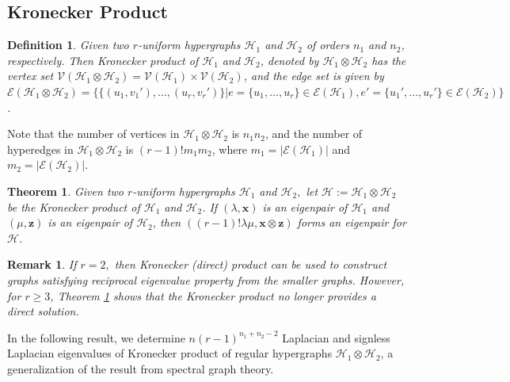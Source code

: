 \documentclass[10pt,a4paper]{article}
\newtheorem{definition}{Definition}[section]
\newtheorem{theorem}{Theorem}[section]
\newtheorem{remark}{Remark}[section]
\begin{document}
	
	
	\subsection{Kronecker Product}
	
	
	
	\begin{definition}\label{Kronecker_product}
		Given two $r$-uniform hypergraphs $\mathcal{H}_1$ and $\mathcal{H}_2$ of orders $n_1$ and $n_2$, respectively. 
		Then Kronecker product of $\mathcal{H}_1$ and $\mathcal{H}_2$, denoted by $\mathcal{H}_1 \otimes \mathcal{H}_2$ has the vertex set $\mathcal{V}(\mathcal{H}_1 \otimes \mathcal{H}_2)= \mathcal{V}(\mathcal{H}_1) \times \mathcal{V}(\mathcal{H}_2)$, and the edge set is given by $\mathcal{E}(\mathcal{H}_1 \otimes \mathcal{H}_2) = \{ \{ (u_1,v_1'), \ldots, (u_r,v_r') \} \vert e=\{u_1,\ldots,u_r \} \in \mathcal{E}(\mathcal{H}_1), e'=\{u_1',\ldots,u_r' \} \in \mathcal{E}(\mathcal{H}_2)\}$.
	\end{definition}
	Note that the number of vertices in $\mathcal{H}_1 \otimes \mathcal{H}_2$ is $n_1n_2$, and the number of hyperedges in $\mathcal{H}_1 \otimes \mathcal{H}_2$ is $(r-1)!m_1m_2$, where $m_1=\vert \mathcal{E}(\mathcal{H}_1)  \vert $ and $m_2=\vert \mathcal{E}(\mathcal{H}_2) \vert.$
	
	
	\begin{theorem}\cite{shao2013general}\label{Kronecker_adjacency}
		Given two $r$-uniform hypergraphs $\mathcal{H}_1$ and $\mathcal{H}_2,$ let $\mathcal{H}:=\mathcal{H}_1 \otimes \mathcal{H}_2$ be the Kronecker product of $\mathcal{H}_1$ and $\mathcal{H}_2$.
		If $(\lambda, \mathbf{x})$ is an eigenpair of $\mathcal{H}_1$ and $(\mu,\mathbf{z})$ is an eigenpair of $\mathcal{H}_2$, then $((r-1)!\lambda\mu, \mathbf{x} \otimes \mathbf{z})$ forms an eigenpair for $\mathcal{H}$.
	\end{theorem}
	
	\begin{remark}
		If $r=2,$ then Kronecker (direct) product can be used to construct graphs satisfying reciprocal eigenvalue property from the smaller graphs. However, for $r \geq 3$, Theorem \ref{Kronecker_adjacency} shows that the Kronecker product no longer provides a direct solution.
	\end{remark}
	
	In the following result, we determine $n(r-1)^{n_1+n_2-2}$ Laplacian and signless Laplacian eigenvalues of Kronecker product of regular hypergraphs $\mathcal{H}_1 \otimes \mathcal{H}_2$, a generalization of the result from spectral graph theory.
	
\end{document}
